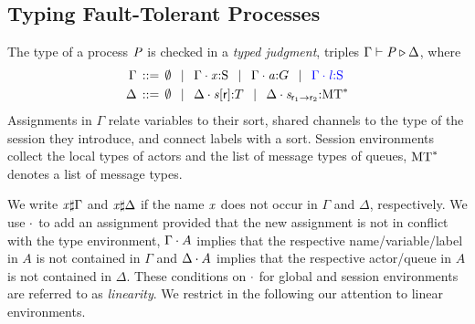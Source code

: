 \subsection{Typing Fault-Tolerant Processes}
\label{sec:typing}

The type of a process $ \PT $ is checked in a \emph{typed judgment}, \ie triples $ \Gamma \vdash \PT \triangleright \Delta $, where
\begin{align*}
	\Gamma & \deffTerms \emptyset
		\sepTerms \Gamma \compS \Typed{\Args}{\Sort}
		\sepTerms \Gamma \compS \Typed{\Chan[a]}{\GT}
		\sepTerms \textcolor{blue}{\Gamma \compS \Typed{\Label}{\Sort}}\\
	\Delta &\deffTerms \emptyset
		\sepTerms \Delta \compS \Typed{\AT{\Chan}{\Role}}{\LT}
		\sepTerms \Delta \compS \MQ{\Chan}{\Role_1}{\Role_2}{\MT^*}
\end{align*}
Assignments in $ \Gamma $ relate variables to their sort, shared channels to the type of the session they introduce, and connect labels with a sort.
Session environments collect the local types of actors and the list of message types of queues, \ie $ \MT^* $ denotes a list of message types.

We write $ \Args \sharp \Gamma $ and $ \Args \sharp \Delta $ if the name $ \Args $ does not occur in $ \Gamma $ and $ \Delta $, respectively.
We use $ \compS $ to add an assignment provided that the new assignment is not in conflict with the type environment, \ie $ \Gamma \compS A $ implies that the respective name/variable/label in $ A $ is not contained in $ \Gamma $ and $ \Delta \compS A $ implies that the respective actor/queue in $ A $ is not contained in $ \Delta $.
These conditions on $ \compS $ for global and session environments are referred to as \emph{linearity}.
We restrict in the following our attention to linear environments.



